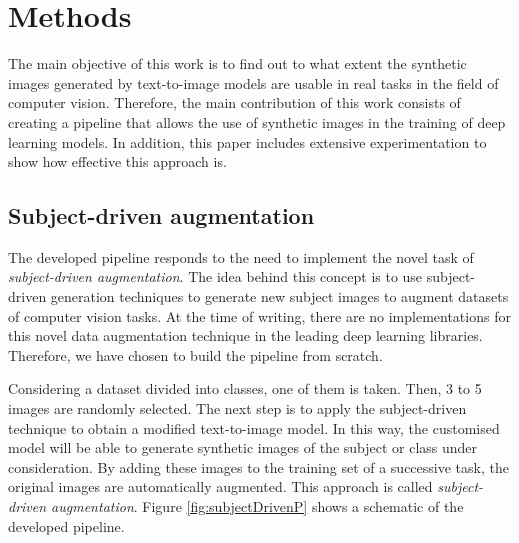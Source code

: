 \chapter{Methods} \label{sec:methods}

The main objective of this work is to find out to what extent the synthetic images generated by text-to-image models are usable in real tasks in the field of computer vision. Therefore, the main contribution of this work consists of creating a pipeline that allows the use of synthetic images in the training of deep learning models. In addition, this paper includes extensive experimentation to show how effective this approach is.

\section{Subject-driven augmentation} \label{sec: sdAugmentation}

The developed pipeline responds to the need to implement the novel task of \textit{subject-driven augmentation}. The idea behind this concept is to use subject-driven generation techniques to generate new subject images to augment datasets of computer vision tasks. At the time of writing, there are no implementations for this novel data augmentation technique in the leading deep learning libraries. Therefore, we have chosen to build the pipeline from scratch.

Considering a dataset divided into classes, one of them is taken. Then, 3 to 5 images are randomly selected. The next step is to apply the subject-driven technique to obtain a modified text-to-image model. In this way, the customised model will be able to generate synthetic images of the subject or class under consideration. By adding these images to the training set of a successive task, the original images are automatically augmented. This approach is called \textit{subject-driven augmentation}. Figure \ref{fig:subjectDrivenP} shows a schematic of the developed pipeline.

